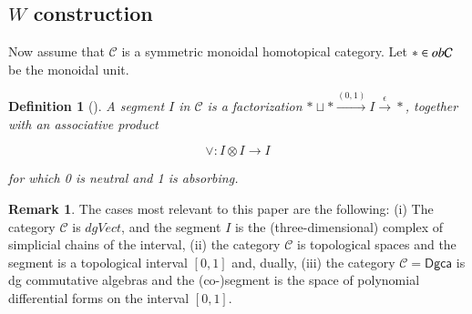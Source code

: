 \documentclass[a4paper]{amsart}
\theoremstyle{plain}
\newtheorem{defi}[thm]{Definition}
\theoremstyle{definition}
\newtheorem{rem}[thm]{Remark}
\newcommand{\dgca}{\mathsf{Dgca}}
\newcommand{\mC}{{\mathcal{C}}}
\newcommand{\beq}[1]{
\begin{equation}\label{#1}
}
\newcommand{\eeq}{
\end{equation}
}
\begin{document}
\subsection{\texorpdfstring{$W$}{W} construction}\label{sec:W}

Now assume that $\mC$ is a symmetric monoidal homotopical category. Let $*\in \ob \mC$ be the monoidal unit.

\begin{defi}[{\cite[Definition 4.1]{BM}}]
A segment $I$ in $\mC$ is a factorization $*\sqcup *\xrightarrow{(0,1)} I \xrightarrow{\epsilon} *$, together with an associative product
\beq{equ:veemap}
\vee : I\otimes I\to I
\eeq
for which 0 is neutral and 1 is absorbing.
\end{defi}

\begin{rem}
The cases most relevant to this paper are the following: (i) The category $\mC$ is $dgVect$, and the segment $I$ is the (three-dimensional) complex of simplicial chains of the interval, (ii) the category $\mC$ is topological spaces and the segment is a topological interval $[0,1]$ and, dually, (iii) the category $\mC=\dgca$ is dg commutative algebras and the (co-)segment is the space of polynomial differential forms on the interval $[0,1]$.
\end{rem}
\end{document}
